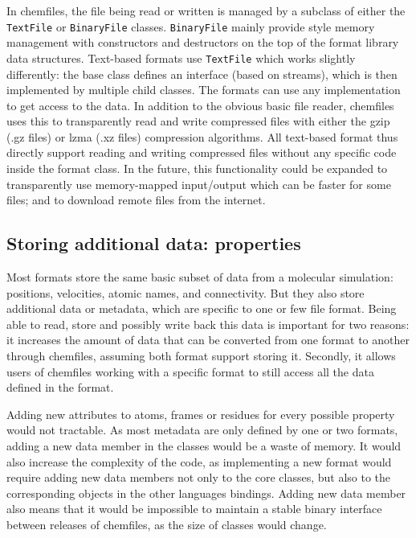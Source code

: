 \documentclass[thesis]{subfiles}
\begin{document}
In chemfiles, the file being read or written is managed by a subclass of either
the \texttt{TextFile} or \texttt{BinaryFile} classes. \texttt{BinaryFile} mainly
provide \cxx style memory management with constructors and destructors on the
top of the format library data structures. Text-based formats use
\texttt{TextFile} which works slightly differently: the base class defines an
interface (based on \cxx streams), which is then implemented by multiple child
classes. The formats can use any implementation to get access to the data. In
addition to the obvious basic file reader, chemfiles uses this to transparently
read and write compressed files with either the gzip (.gz files) or lzma (.xz
files) compression algorithms. All text-based format thus directly support
reading and writing compressed files without any specific code inside the format
class. In the future, this functionality could be expanded to transparently use
memory-mapped input/output which can be faster for some files; and to download
remote files from the internet.

\subsection{Storing additional data: properties}

Most formats store the same basic subset of data from a molecular simulation:
positions, velocities, atomic names, and connectivity. But they also store
additional data or metadata, which are specific to one or few file format. Being
able to read, store and possibly write back this data is important for two
reasons: it increases the amount of data that can be converted from one format
to another through chemfiles, assuming both format support storing it. Secondly,
it allows users of chemfiles working with a specific format to still access all
the data defined in the format.

Adding new attributes to atoms, frames or residues for every possible property
would not tractable. As most metadata are only defined by one or two
formats, adding a new data member in the classes would be a waste of memory. It
would also increase the complexity of the code, as implementing a new format
would require adding new data members not only to the core \cxx classes, but
also to the corresponding objects in the other languages bindings. Adding new
data member also means that it would be impossible to maintain a stable binary
interface between releases of chemfiles, as the size of classes would change.
\end{document}
